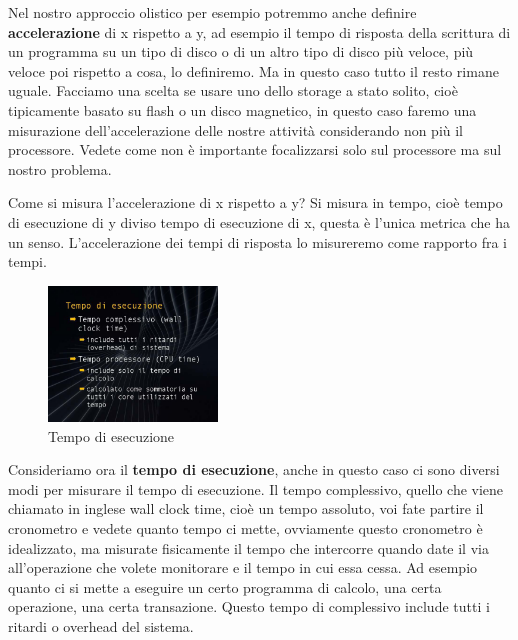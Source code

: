 Nel nostro approccio olistico per esempio potremmo anche definire \textbf{accelerazione} di x rispetto a y, ad esempio il tempo di risposta della scrittura di un programma su un tipo di disco o di un altro tipo di disco più veloce, più veloce poi rispetto a cosa, lo definiremo. Ma in questo caso tutto il resto rimane uguale. Facciamo una scelta se usare uno dello storage a stato solito, cioè tipicamente basato su flash o un disco magnetico, in questo caso faremo una misurazione dell'accelerazione delle nostre attività considerando non più il processore. Vedete come non è importante focalizzarsi solo sul processore ma sul nostro problema.

Come si misura l'accelerazione di x rispetto a y?
Si misura in tempo, cioè tempo di esecuzione di y diviso tempo di esecuzione di x, questa è l'unica metrica che ha un senso.
L'accelerazione dei tempi di risposta lo misureremo come rapporto fra i tempi.

\FloatBarrier
\begin{figure}[H]
  \centering
  \includegraphics[width=0.40\textwidth,
                    trim=40 40 10 40, %
                    clip]
                    {images/Lez03_p03_fig_04.png}
  \caption{Tempo di esecuzione}
  \label{fig:Lez03_p03_fig_04}
\end{figure}
\FloatBarrier
\noindent

Consideriamo ora il \textbf{tempo di esecuzione}, anche in questo caso ci sono diversi modi per misurare il tempo di esecuzione.
Il tempo complessivo, quello che viene chiamato in inglese wall clock time, cioè un tempo assoluto, voi fate partire il cronometro e vedete quanto tempo ci mette, ovviamente questo cronometro è idealizzato, ma misurate fisicamente il tempo che intercorre quando date il via all'operazione che volete monitorare e il tempo in cui essa cessa.
Ad esempio quanto ci si mette a eseguire un certo programma di calcolo, una certa operazione, una certa transazione.
Questo tempo di complessivo include tutti i ritardi o overhead del sistema.

